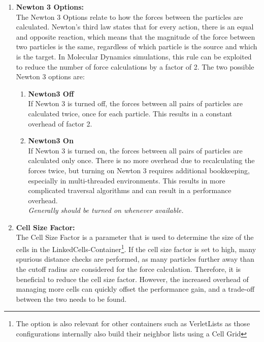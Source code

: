 \begin{enumerate}[label=\textbf{\arabic*.}]
      \item \textbf{Newton 3 Options:} \\
            The Newton 3 Options relate to how the forces between the particles are calculated. Newton's third law states that for every action, there is an equal and opposite reaction, which means that the magnitude of the force between two particles is the same, regardless of which particle is the source and which is the target. In Molecular Dynamics simulations, this rule can be exploited to reduce the number of force calculations by a factor of 2. The two possible Newton 3 options are:
            \begin{enumerate}
                  \item \textbf{Newton3 Off} \\
                        If Newton 3 is turned off, the forces between all pairs of particles are calculated twice, once for each particle. This results in a constant overhead of factor 2.

                  \item \textbf{Newton3 On} \\
                        If Newton 3 is turned on, the forces between all pairs of particles are calculated only once. There is no more overhead due to recalculating the forces twice, but turning on Newton 3 requires additional bookkeeping, especially in multi-threaded environments. This results in more complicated traversal algorithms and can result in a performance overhead.\\
                        \textit{Generally should be turned on whenever available.}
            \end{enumerate}

      \item \textbf{Cell Size Factor:} \\
            The Cell Size Factor is a parameter that is used to determine the size of the cells in the LinkedCells-Container\footnote{The option is also relevant for other containers such as VerletLists as those configurations internally also build their neighbor lists using a Cell Grid}. If the cell size factor is set to high, many spurious distance checks are performed, as many particles further away than the cutoff radius are considered for the force calculation. Therefore, it is beneficial to reduce the cell size factor. However, the increased overhead of managing more cells can quickly offset the performance gain, and a trade-off between the two needs to be found.\\

\end{enumerate}

